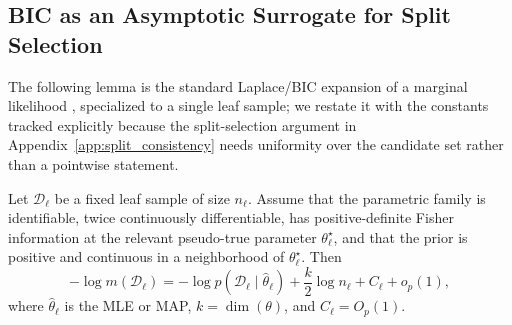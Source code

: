 \subsection{BIC as an Asymptotic Surrogate for Split Selection}
\label{app:bic_uniform}

The following lemma is the standard Laplace/BIC expansion of a marginal likelihood \citep{schwarz1978estimating,kass1995bayes}, specialized to a single leaf sample; we restate it with the constants tracked explicitly because the split-selection argument in Appendix~\ref{app:split_consistency} needs uniformity over the candidate set rather than a pointwise statement.

\begin{lemma}
\label{lem:laplace_leaf}
Let $\mathcal{D}_\ell$ be a fixed leaf sample of size $n_\ell$.
Assume that the parametric family is identifiable, twice continuously differentiable, has positive-definite Fisher information at the relevant pseudo-true parameter $\theta_\ell^\star$, and that the prior is positive and continuous in a neighborhood of $\theta_\ell^\star$.
Then
\[
-\log m(\mathcal{D}_\ell)
=
-\log p(\mathcal{D}_\ell\mid\hat{\theta}_\ell)
+
\frac{k}{2}\log n_\ell
+
C_\ell
+
o_p(1),
\]
where $\hat{\theta}_\ell$ is the MLE or MAP, $k=\dim(\theta)$, and $C_\ell=O_p(1)$.
\end{lemma}

